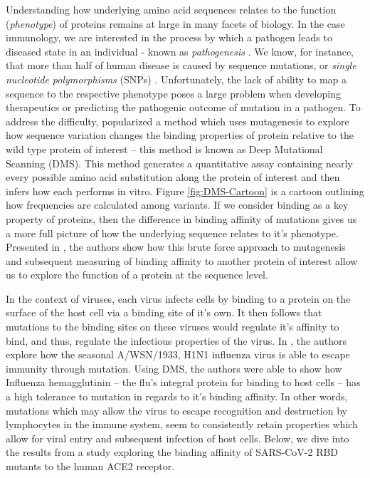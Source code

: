 \documentclass{article}
\begin{document}
Understanding how underlying amino acid sequences relates to the function (\textit{phenotype}) of proteins remains at large in many facets of biology.
In the case immunology, we are interested in the process by which a pathogen leads to diseased state in an individual - known as \textit{pathogenesis} \citep{Araya2011, Fowler2014, Weile2018}.
We know, for instance, that more than half of human disease is caused by sequence mutations, or \textit{single nucleotide polymorphisms} (SNPs) \citep{Stenson2009}.
Unfortunately, the lack of ability to map a sequence to the respective phenotype poses a large problem when developing therapeutics or predicting the pathogenic outcome of mutation in a pathogen.
To address the difficulty, \citep{Araya2011} popularized a method which uses mutagenesis to explore how sequence variation changes the binding properties of protein relative to the wild type protein of interest -- this method is known as Deep Mutational Scanning (DMS).
This method generates a quantitative assay containing nearly every possible amino acid substitution along the protein of interest and then infers how each performs in vitro.
Figure \ref{fig:DMS-Cartoon} is a cartoon outlining how frequencies are calculated among variants.
If we consider binding as a key property of proteins, then the difference in binding affinity of mutations gives us a more full picture of how the underlying sequence relates to it's phenotype.
Presented in \citet{Adams2016}, the authors show how this brute force approach to mutagenesis and subsequent measuring of binding affinity to another protein of interest allow us to explore the function of a protein at the sequence level.

In the context of viruses, each virus infects cells by binding to a protein on the surface of the host cell via a binding site of it's own.
It then follows that mutations to the binding sites on these viruses would regulate it's affinity to bind, and thus, regulate the infectious properties of the virus.
In \citet{Bloom2014}, the authors explore how the seasonal A/WSN/1933, H1N1 influenza virus is able to escape immunity through mutation.
Using DMS, the authors were able to show how Influenza hemagglutinin -- the flu's integral protein for binding to host cells -- has a high tolerance to mutation in regards to it's binding affinity.
In other words, mutations which may allow the virus to escape recognition and destruction by lymphocytes in the immune system, seem to consistently retain properties which allow for viral entry and subsequent infection of host cells.
Below, we dive into the results from a study exploring the binding affinity of SARS-CoV-2 RBD mutants to the human ACE2 receptor.
\end{document}
